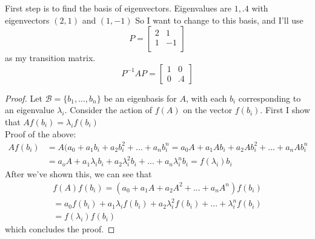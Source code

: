 \documentclass[12pt]{article}
\newenvironment{problem}[2][Problem]{\begin{trivlist}
\item[\hskip \labelsep {\bfseries #1}\hskip \labelsep {\bfseries #2.}]}{\end{trivlist}}
\theoremstyle{definition}
\theoremstyle{definition}
\theoremstyle{definition}
\theoremstyle{definition}
\begin{document}
\begin{problem}{4.13}
First step is to find the basis of eigenvectors. Eigenvalues are $1, .4$ with eigenvectors $(2, 1)$ and $(1, -1)$ So I want to change to this basis, and I'll use 
$$
P = \begin{bmatrix}
2 & 1 \\
1 & -1\\
\end{bmatrix}
$$
as my transition matrix.  
$$
P^{-1}AP = \begin{bmatrix}
1 & 0 \\
0 & .4
\end{bmatrix}
$$
\end{problem}

\begin{problem}{4.15}
\begin{proof}
Let $\mathcal{B} = \{b_1, ..., b_n\}$ be an eigenbasis for $A$, with each $b_i$ corresponding to an eigenvalue $\lambda_i$. Consider the action of $f(A)$ on the vector $f(b_i)$. First I show that $Af(b_i) = \lambda_i f(b_i)$ \\
Proof of the above: 
\begin{align*}
Af(b_i) &= A(a_0 + a_1b_i + a_2b_i^2 +... +a_nb_i^n = a_0A + a_1Ab_i + a_2Ab_i^2 + ... +a_nAb_i^n \\
&= a_oA + a_1 \lambda_i b_i + a_2 \lambda_i^2 b_i +  ... + a_n \lambda_i^n b_i = f(\lambda_i)b_i
\end{align*} 
After we've shown this, we can see that
\begin{align*}
f(A)f(b_i) = (a_0 + a_1A + a_2A^2 + ... + a_nA^n)f(b_i) \\
= a_0f(b_i) + a_1 \lambda_i f(b_i) + a_2 \lambda_i^2 f(b_i) + ... + \lambda_i^n f(b_i) \\
= f(\lambda_i)f(b_i)
\end{align*}
which concludes the proof. 
\end{proof}
\end{problem}
\end{document}
